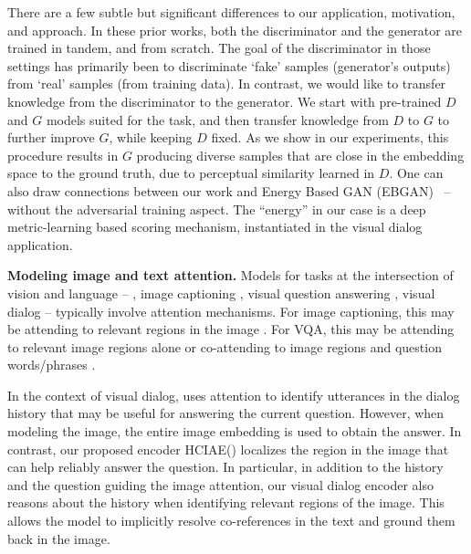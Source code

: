 \documentclass{article}
\newcommand{\ourenc}{HCIAE\xspace}
\begin{document}
There are a few subtle but significant differences \wrt to our application, motivation, and approach. 
In these prior works, both the discriminator and the 
generator are trained in tandem, and from scratch.
The goal of the discriminator in those settings has primarily been to 
discriminate `fake' samples (\ie generator's outputs) from `real' samples 
(\ie from training data). In contrast, we would like to  transfer 
knowledge from the discriminator to the generator. We start with pre-trained $D$ and $G$ models 
suited for the task, and then transfer knowledge from $D$ to 
$G$ to further improve $G$, while keeping $D$ fixed. 
As we show in our experiments, this procedure results in 
$G$ producing diverse samples that are close in the embedding space to the ground truth, 
due to perceptual similarity learned in $D$.  
One can also draw connections between our work and Energy Based GAN (EBGAN)~\cite{ebgan} -- 
without the adversarial training aspect. The ``energy'' in our case is a deep metric-learning based scoring mechanism, 
instantiated in the visual dialog application.


{\bf Modeling image and text attention.} 
Models for tasks at the intersection of vision and language -- \eg, image captioning 
\cite{donahue_cvpr15, fang_cvpr15, karpathy_cvpr15, vinyals2015show}, visual question 
answering \cite{antol2015vqa, gao2015you, malinowski2015ask, ren2015exploring},
visual dialog \cite{visdial, de2016guesswhat, das2017learning, strub2017end,mostafazadeh2017image} -- typically 
involve attention mechanisms. For image captioning, this may be attending to relevant 
regions in the image \cite{vinyals2015show,showattendtell15,LuXPS16}. 
For VQA, this may be attending to relevant image regions alone \cite{chen2015abc, xu2016ask,yang2016stacked} or 
co-attending to image regions and question words/phrases \cite{lu2016hierarchical}. 

In the context of visual dialog, \cite{visdial} uses attention to identify utterances in 
the dialog history that may be useful for answering the current question. However, when 
modeling the image, the entire image embedding is used to obtain the answer. In contrast, 
our proposed encoder \ourenc () localizes the region in the image that can help  
reliably answer the question. In particular, in addition to the history and the question guiding the image 
attention, our visual dialog encoder also reasons about 
the history when identifying relevant regions of the image. 
This allows the model to implicitly resolve co-references in the text and ground them back in the image.
\end{document}
